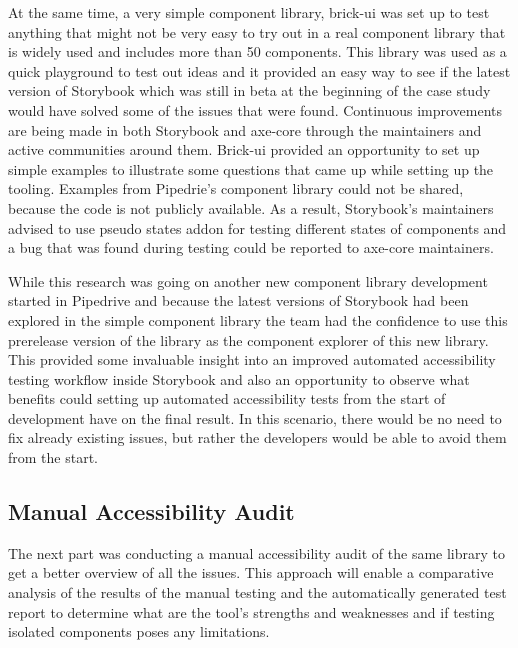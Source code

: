 \documentclass{master_thesis}
\begin{document}
At the same time, a very simple component library, brick-ui was set up to test anything that might not be very easy to try out in a real component library that is widely used and includes more than 50 components. This library was used as a quick playground to test out ideas and it provided an easy way to see if the latest version of Storybook which was still in beta at the beginning of the case study would have solved some of the issues that were found. Continuous improvements are being made in both  Storybook and axe-core through the maintainers and active communities around them. Brick-ui provided an opportunity to set up simple examples to illustrate some questions that came up while setting up the tooling. Examples from Pipedrie's component library could not be shared, because the code is not publicly available. As a result, Storybook's maintainers advised to use pseudo states addon for testing different states of components and a bug that was found during testing could be reported to axe-core maintainers.

While this research was going on another new component library development started in Pipedrive and because the latest versions of Storybook had been explored in the simple component library the team had the confidence to use this prerelease version of the library as the component explorer of this new library. This provided some invaluable insight into an improved automated accessibility testing workflow inside Storybook and also an opportunity to observe what benefits could setting up automated accessibility tests from the start of development have on the final result. In this scenario, there would be no need to fix already existing issues, but rather the developers would be able to avoid them from the start.

\subsection{Manual Accessibility Audit}

The next part was conducting a manual accessibility audit of the same library to get a better overview of all the issues. This approach will enable a comparative analysis of the results of the manual testing and the automatically generated test report to determine what are the tool's strengths and weaknesses and if testing isolated components poses any limitations.
\end{document}
